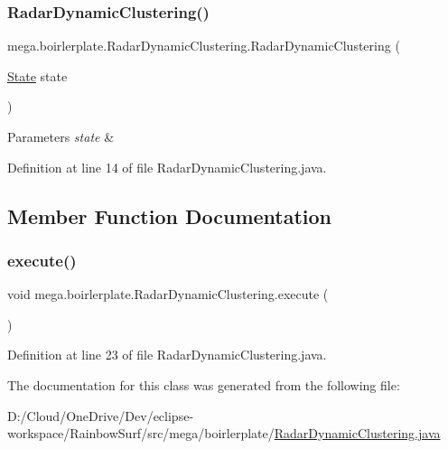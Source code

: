 \subsubsection{\texorpdfstring{Radar\+Dynamic\+Clustering()}{RadarDynamicClustering()}}
{\footnotesize\ttfamily mega.\+boirlerplate.\+Radar\+Dynamic\+Clustering.\+Radar\+Dynamic\+Clustering (\begin{DoxyParamCaption}\item[{\hyperlink{classmega_1_1boirlerplate_1_1_state}{State}}]{state }\end{DoxyParamCaption})}


\begin{DoxyParams}{Parameters}
{\em state} & \\
\hline
\end{DoxyParams}


Definition at line 14 of file Radar\+Dynamic\+Clustering.\+java.



\subsection{Member Function Documentation}
\mbox{\label{classmega_1_1boirlerplate_1_1_radar_dynamic_clustering_a27a165d0293cabed6a9c3fb1a6e0d7cb}} 
\subsubsection{\texorpdfstring{execute()}{execute()}}
{\footnotesize\ttfamily void mega.\+boirlerplate.\+Radar\+Dynamic\+Clustering.\+execute (\begin{DoxyParamCaption}{ }\end{DoxyParamCaption})}



Definition at line 23 of file Radar\+Dynamic\+Clustering.\+java.



The documentation for this class was generated from the following file\+:\begin{DoxyCompactItemize}
\item 
D\+:/\+Cloud/\+One\+Drive/\+Dev/eclipse-\/workspace/\+Rainbow\+Surf/src/mega/boirlerplate/\hyperlink{_radar_dynamic_clustering_8java}{Radar\+Dynamic\+Clustering.\+java}\end{DoxyCompactItemize}
